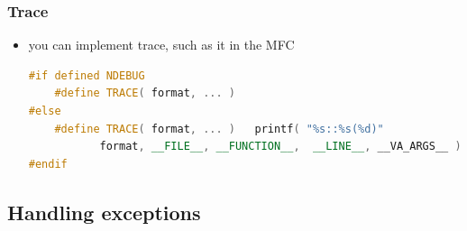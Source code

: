 \documentclass[a4paper,12pt,twoside]{book}
\begin{document}
\subsubsection{Trace}
\begin{itemize}
\item you can implement trace, such as it in the MFC
\begin{lstlisting}[frame=single, language=c++]
#if defined NDEBUG
    #define TRACE( format, ... )
#else
    #define TRACE( format, ... )   printf( "%s::%s(%d)"
           format, __FILE__, __FUNCTION__,  __LINE__, __VA_ARGS__ )
#endif
\end{lstlisting}

\end{itemize}

\subsection{Handling exceptions}
\end{document}
